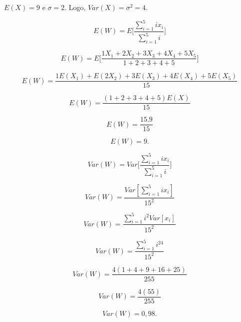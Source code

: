 \documentclass[hidelinks,11pt]{book}
\theoremstyle{definition}
\begin{document}
$E(X) = 9$ e $\sigma = 2$. Logo, $Var(X) = \sigma^2 = 4$.

\begin{displaymath}
	E(W) = E \Bigg[ \frac{\sum_{i = 1}^{5} ix_i}{\sum_{i = 1}^{5} i} \Bigg]
\end{displaymath}

\begin{displaymath}
	E(W) = E\Bigg[\frac{1X_1 + 2X_2 + 3X_3 + 4X_4 + 5X_5}{1+ 2+ 3+ 4 + 5} \Bigg]
\end{displaymath}

\begin{displaymath}
	E(W) = \frac{1E(X_1) + E(2X_2) + 3E(X_3) + 4E(X_4) + 5E(X_5)}{15}
\end{displaymath}

\begin{displaymath}
	E(W) = \frac{(1 + 2+ 3+ 4 + 5)E(X)}{15}
\end{displaymath}

\begin{displaymath}
	E(W) = \frac{15.9}{15}
\end{displaymath}

\begin{displaymath}
	E(W) = 9.
\end{displaymath}

\begin{displaymath}
	Var(W) = Var\Bigg[ \frac{\sum_{i = 1}^{5} ix_i}{\sum_{i = 1}^{5} i} \Bigg]
\end{displaymath}

\begin{displaymath}
	Var(W) = \frac{Var[ \sum_{i = 1}^{5} ix_i]}{15^2} 
\end{displaymath}

\begin{displaymath}
	Var(W) = \frac{\sum_{i = 1}^{5}i^2Var[ x_i]}{15^2} 
\end{displaymath}

\begin{displaymath}
	Var(W) = \frac{\sum_{i = 1}^{5}i^24}{15^2} 
\end{displaymath}

\begin{displaymath}
	Var(W) = \frac{4(1 + 4 + 9 +16 + 25)}{255}
\end{displaymath}

\begin{displaymath}
	Var(W) = \frac{4(55)}{255}
\end{displaymath}

\begin{displaymath}
	Var(W) = 0,98.
\end{displaymath}
\end{document}
